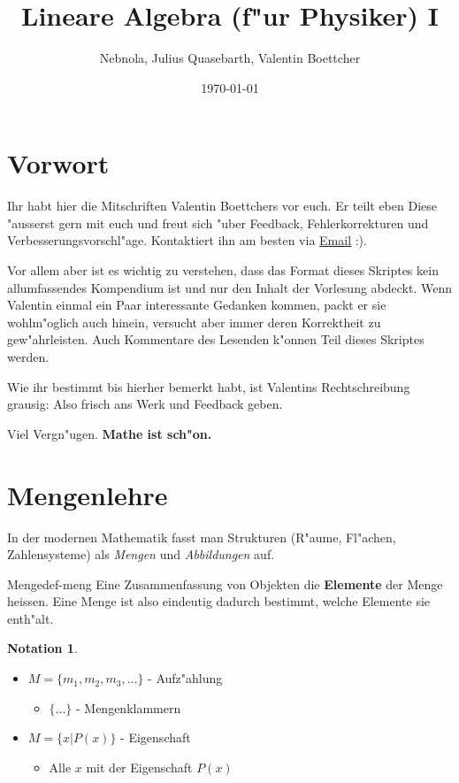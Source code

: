 \documentclass[11pt]{article}
\author{Nebnola, Julius Quasebarth, Valentin Boettcher}
\date{\today}
\title{Lineare Algebra (f"ur Physiker) I}
\theoremstyle{remark}
\theoremstyle{definition}
\newtheorem*{notation}{Notation}
\theoremstyle{remark}
\begin{document}
\maketitle
\tableofcontents

\maketitle
\newpage

\section{Vorwort}
\label{sec:org8d9fa1c}
Ihr habt hier die Mitschriften Valentin Boettchers vor euch. Er teilt eben Diese
"ausserst gern mit euch und freut sich "uber Feedback, Fehlerkorrekturen und
Verbesserungsvorschl"age. Kontaktiert ihn am besten via \href{mailto:valentin.boettcher@mailbox.tu-dresden.de}{Email} :).

Vor allem aber ist es wichtig zu verstehen, dass das Format dieses Skriptes
kein allumfassendes Kompendium ist und nur den Inhalt der Vorlesung abdeckt.
Wenn Valentin einmal ein Paar interessante Gedanken kommen, packt er sie
wohlm"oglich auch hinein, versucht aber immer deren Korrektheit zu
gew"ahrleisten. Auch Kommentare des Lesenden k"onnen Teil dieses Skriptes
werden.

Wie ihr bestimmt bis hierher bemerkt habt, ist Valentins Rechtschreibung
grausig: Also frisch ans Werk und Feedback geben.


Viel Vergn"ugen. \textbf{Mathe ist sch"on.}

\section{Mengenlehre}
\label{sec:orgd4be270}
In der modernen Mathematik fasst man Strukturen (R"aume, Fl"achen,
Zahlensysteme) als \emph{Mengen} und \emph{Abbildungen} auf.

\begin{definition}{Menge}{def-meng}
Eine Zusammenfassung von Objekten die \textbf{Elemente} der Menge heissen. Eine Menge ist
also eindeutig dadurch bestimmt, welche Elemente sie enth"alt.
\end{definition}

\begin{notation}\
\begin{itemize}
\item \(M=\{m_1,m_2,m_3,...\}\) - Aufz"ahlung
\begin{itemize}
\item \(\{...\}\) - Mengenklammern
\end{itemize}
\item \(M=\{x| P(x)\}\) - Eigenschaft
\begin{itemize}
\item Alle \(x\) mit der Eigenschaft \(P(x)\)
\end{itemize}
\end{itemize}
\end{notation}
\end{document}
